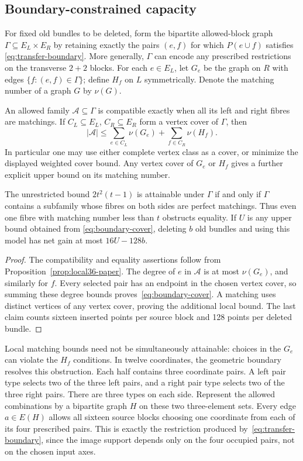 \subsection{Boundary-constrained capacity}
For fixed old bundles to be deleted, form the bipartite allowed-block
graph $\Gamma\subseteq E_L\times E_R$ by retaining exactly the pairs
$(e,f)$ for which $P(e\cup f)$ satisfies
\eqref{eq:transfer-boundary}. More generally, $\Gamma$ can encode any
prescribed restrictions on the transverse $2+2$ blocks. For each
$e\in E_L$, let $G_e$ be the graph on $R$ with edges
$\{f:(e,f)\in\Gamma\}$; define $H_f$ on $L$ symmetrically. Denote
the matching number of a graph $G$ by $\nu(G)$.

\begin{proposition}\label{prop:boundary-capacity}
An allowed family $\mathcal A\subseteq\Gamma$ is compatible exactly
when all its left and right fibres are matchings. If
$C_L\subseteq E_L$, $C_R\subseteq E_R$ form a vertex cover of
$\Gamma$, then
\begin{equation}\label{eq:boundary-cover}
 |\mathcal A|\le
 \sum_{e\in C_L}\nu(G_e)+\sum_{f\in C_R}\nu(H_f).
\end{equation}
In particular one may use either complete vertex class as a cover,
or minimize the displayed weighted cover bound. Any vertex cover of
$G_e$ or $H_f$ gives a further explicit upper bound on its matching number.

The unrestricted bound $2t^2(t-1)$ is attainable under $\Gamma$ if
and only if $\Gamma$ contains a subfamily whose fibres on both sides
are perfect matchings. Thus even one fibre with matching number less
than $t$ obstructs equality. If $U$ is any upper bound obtained from
\eqref{eq:boundary-cover}, deleting $b$ old bundles and using this
model has net gain at most $16U-128b$.
\end{proposition}
\begin{proof}
The compatibility and equality assertions follow from
Proposition~\ref{prop:local36-paper}. The degree of $e$ in
$\mathcal A$ is at most $\nu(G_e)$, and similarly for $f$.
Every selected pair has an endpoint in the chosen vertex cover, so
summing these degree bounds proves~\eqref{eq:boundary-cover}.
A matching uses distinct vertices of any vertex cover, proving the
additional local bound. The last claim counts sixteen inserted points
per source block and 128 points per deleted bundle.
\end{proof}

Local matching bounds need not be simultaneously attainable: choices
in the $G_e$ can violate the $H_f$ conditions. In twelve coordinates,
the geometric boundary resolves this obstruction. Each half contains
three coordinate pairs. A left pair type selects two of the three left
pairs, and a right pair type selects two of the three right pairs.
There are three types on each side. Represent the allowed combinations
by a bipartite graph $H$ on these two three-element sets. Every edge
$a\in E(H)$ allows all sixteen source blocks choosing one coordinate
from each of its four prescribed pairs. This is exactly the restriction
produced by~\eqref{eq:transfer-boundary}, since the image support depends
only on the four occupied pairs, not on the chosen input axes.

